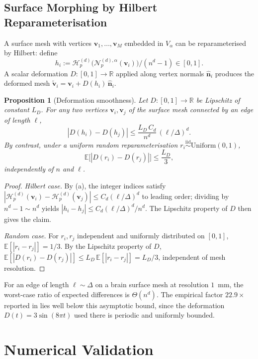 \documentclass[11pt,a4paper]{article}
\theoremstyle{plain}
\newtheorem{proposition}[theorem]{Proposition}
\theoremstyle{definition}
\theoremstyle{remark}
\newcommand{\R}{\mathbb{R}}
\newcommand{\Hil}{\mathcal{H}}
\newcommand{\Nor}{\mathcal{N}}
\begin{document}
\subsection{Surface Morphing by Hilbert Reparameterisation}
\label{sec:app_morphing}

A surface mesh with vertices $\mathbf{v}_1,\dots,\mathbf{v}_M$ embedded
in $V_\alpha$ can be reparameterised by Hilbert: define
\[
h_i := \Hil_p^{(d)}\bigl(\Nor_p^{(d),\alpha}(\mathbf{v}_i)\bigr) /
       (n^d - 1) \in [0,1].
\]
A scalar deformation $D:[0,1]\to\R$ applied along vertex normals
$\hat{\mathbf{n}}_i$ produces the deformed mesh
$\tilde{\mathbf{v}}_i = \mathbf{v}_i + D(h_i)\,\hat{\mathbf{n}}_i$.

\begin{proposition}[Deformation smoothness]\label{prop:morphing}
Let $D:[0,1]\to\R$ be Lipschitz of constant $L_D$. For any two
vertices $\mathbf{v}_i,\mathbf{v}_j$ of the surface mesh connected by
an edge of length $\ell$,
\[
|D(h_i)-D(h_j)| \leq \frac{L_D\,C_d}{n^d}\,(\ell/\Delta)^d.
\]
By contrast, under a uniform random reparameterisation
$r_i \stackrel{\mathrm{iid}}{\sim}\mathrm{Uniform}(0,1)$,
\[
\mathbb{E}\bigl[|D(r_i)-D(r_j)|\bigr] \leq \frac{L_D}{3},
\]
\emph{independently of} $n$ and $\ell$.
\end{proposition}

\begin{proof}
\emph{Hilbert case.} By (a), the integer indices
satisfy
$|\Hil_p^{(d)}(\mathbf{v}_i)-\Hil_p^{(d)}(\mathbf{v}_j)|\leq C_d(\ell/\Delta)^d$
to leading order; dividing by $n^d-1\sim n^d$ yields
$|h_i-h_j|\leq C_d(\ell/\Delta)^d/n^d$. The Lipschitz property of $D$
then gives the claim.

\emph{Random case.} For $r_i,r_j$ independent and uniformly distributed
on $[0,1]$, $\mathbb{E}[|r_i-r_j|]=1/3$. By the Lipschitz property of $D$,
$\mathbb{E}[|D(r_i)-D(r_j)|]\leq L_D\,\mathbb{E}[|r_i-r_j|]=L_D/3$,
independent of mesh resolution.
\end{proof}

For an edge of length $\ell\sim\Delta$ on a brain surface mesh at
resolution $1$~mm, the worst-case ratio of expected differences is
$\Theta(n^d)$. The empirical factor $22.9\times$ reported in
 lies well below this asymptotic bound, since
the deformation $D(t)=3\sin(8\pi t)$ used there is periodic and
uniformly bounded.

\section{Numerical Validation}\label{sec:experiments}
\end{document}
